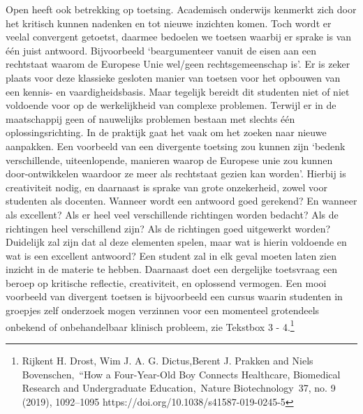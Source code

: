 \documentclass{jote-book}
\begin{document}
	Open heeft ook betrekking op toetsing. Academisch onderwijs kenmerkt zich door het kritisch kunnen nadenken en tot nieuwe inzichten komen. Toch wordt er veelal convergent getoetst, daarmee bedoelen we toetsen waarbij er sprake is van één juist antwoord. Bijvoorbeeld ‘beargumenteer vanuit de eisen aan een rechtstaat waarom de Europese Unie wel/geen rechtsgemeenschap is'. Er is zeker plaats voor deze klassieke gesloten manier van toetsen voor het opbouwen van een kennis- en vaardigheidsbasis. Maar tegelijk bereidt dit studenten niet of niet voldoende voor op de werkelijkheid van complexe problemen. Terwijl er in de maatschappij geen of nauwelijks problemen bestaan met slechts één oplossingsrichting. In de praktijk gaat het vaak om het zoeken naar nieuwe aanpakken. Een voorbeeld van een divergente toetsing zou kunnen zijn ‘bedenk verschillende, uiteenlopende, manieren waarop de Europese unie zou kunnen door-ontwikkelen waardoor ze meer als rechtstaat gezien kan worden'. Hierbij is creativiteit nodig, en daarnaast is sprake van grote onzekerheid, zowel voor studenten als docenten. Wanneer wordt een antwoord goed gerekend? En wanneer als excellent? Als er heel veel verschillende richtingen worden bedacht? Als de richtingen heel verschillend zijn? Als de richtingen goed uitgewerkt worden? Duidelijk zal zijn dat al deze elementen spelen, maar wat is hierin voldoende en wat is een excellent antwoord? Een student zal in elk geval moeten laten zien inzicht in de materie te hebben. Daarnaast doet een dergelijke toetsvraag een beroep op kritische reflectie, creativiteit, en oplossend vermogen. Een mooi voorbeeld van divergent toetsen is bijvoorbeeld een cursus waarin studenten in groepjes zelf onderzoek mogen verzinnen voor een momenteel grotendeels onbekend of onbehandelbaar klinisch probleem, zie Tekstbox 3 - 4.\footnote{Rijkent H. Drost, Wim J. A. G. Dictus,Berent J. Prakken and Niels Bovenschen, “How a Four-Year-Old Boy Connects Healthcare, Biomedical Research and Undergraduate Education, Nature Biotechnology 37, no. 9 (2019), 1092--1095 https://doi.org/10.1038/s41587-019-0245-5}
\end{document}
